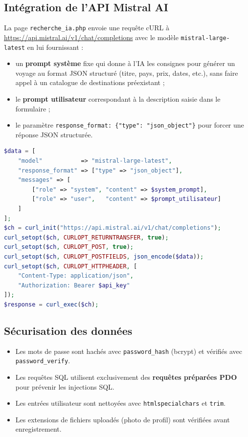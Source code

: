 \documentclass[a4paper,12pt]{article}
\begin{document}
\subsection{Intégration de l'API Mistral AI}

La page \texttt{recherche\_ia.php} envoie une requête cURL à \url{https://api.mistral.ai/v1/chat/completions} avec le modèle \texttt{mistral-large-latest} en lui fournissant :

\begin{itemize}
    \item un \textbf{prompt système} fixe qui donne à l'IA les consignes pour générer un voyage au format JSON structuré (titre, pays, prix, dates, etc.), sans faire appel à un catalogue de destinations préexistant ;
    \item le \textbf{prompt utilisateur} correspondant à la description saisie dans le formulaire ;
    \item le paramètre \texttt{response\_format: \{"type": "json\_object"\}} pour forcer une réponse JSON structurée.
\end{itemize}



\begin{lstlisting}[language=PHP, caption={Appel à l'API Mistral AI}]
$data = [
    "model"           => "mistral-large-latest",
    "response_format" => ["type" => "json_object"],
    "messages" => [
        ["role" => "system", "content" => $system_prompt],
        ["role" => "user",   "content" => $prompt_utilisateur]
    ]
];
$ch = curl_init("https://api.mistral.ai/v1/chat/completions");
curl_setopt($ch, CURLOPT_RETURNTRANSFER, true);
curl_setopt($ch, CURLOPT_POST, true);
curl_setopt($ch, CURLOPT_POSTFIELDS, json_encode($data));
curl_setopt($ch, CURLOPT_HTTPHEADER, [
    "Content-Type: application/json",
    "Authorization: Bearer $api_key"
]);
$response = curl_exec($ch);
\end{lstlisting}

\subsection{Sécurisation des données}

\begin{itemize}
  \item Les mots de passe sont hachés avec \texttt{password\_hash} (bcrypt) et vérifiés avec \texttt{password\_verify}.
  \item Les requêtes SQL utilisent exclusivement des \textbf{requêtes préparées PDO} pour prévenir les injections SQL.
  \item Les entrées utilisateur sont nettoyées avec \texttt{htmlspecialchars} et \texttt{trim}.
  \item Les extensions de fichiers uploadés (photo de profil) sont vérifiées avant enregistrement.
\end{itemize}
\end{document}
